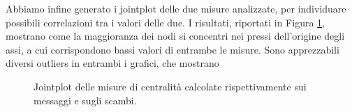 Abbiamo infine generato i jointplot delle due misure analizzate, per individuare possibili correlazioni tra i valori delle due. I risultati, riportati in Figura \ref{fig:joint_centrality}, mostrano come la maggioranza dei nodi si concentri nei pressi dell'origine degli assi, a cui corrispondono bassi valori di entrambe le misure. Sono apprezzabili diversi outliers in entrambi i grafici, che mostrano 
\begin{figure}
	\hfill
	\caption{Jointplot delle misure di centralità calcolate rispettivamente sui messaggi e sugli scambi.}
	\label{fig:joint_centrality}
\end{figure}

\newpage
